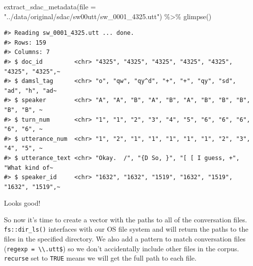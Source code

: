 \documentclass[
]{article}
\newenvironment{Shaded}{\begin{snugshade}}{\end{snugshade}}
\newcommand{\AttributeTok}[1]{\textcolor[rgb]{0.77,0.63,0.00}{#1}}
\newcommand{\CommentTok}[1]{\textcolor[rgb]{0.56,0.35,0.01}{\textit{#1}}}
\newcommand{\ConstantTok}[1]{\textcolor[rgb]{0.00,0.00,0.00}{#1}}
\newcommand{\FunctionTok}[1]{\textcolor[rgb]{0.00,0.00,0.00}{#1}}
\newcommand{\NormalTok}[1]{#1}
\newcommand{\OtherTok}[1]{\textcolor[rgb]{0.56,0.35,0.01}{#1}}
\newcommand{\SpecialCharTok}[1]{\textcolor[rgb]{0.00,0.00,0.00}{#1}}
\newcommand{\StringTok}[1]{\textcolor[rgb]{0.31,0.60,0.02}{#1}}
\begin{document}
\begin{Shaded}
\begin{Highlighting}[]
\FunctionTok{extract\_sdac\_metadata}\NormalTok{(}\AttributeTok{file =} \StringTok{"../data/original/sdac/sw00utt/sw\_0001\_4325.utt"}\NormalTok{) }\SpecialCharTok{\%\textgreater{}\%}
    \FunctionTok{glimpse}\NormalTok{()}
\end{Highlighting}
\end{Shaded}

\begin{verbatim}
#> Reading sw_0001_4325.utt ... done.
#> Rows: 159
#> Columns: 7
#> $ doc_id         <chr> "4325", "4325", "4325", "4325", "4325", "4325", "4325",~
#> $ damsl_tag      <chr> "o", "qw", "qy^d", "+", "+", "qy", "sd", "ad", "h", "ad~
#> $ speaker        <chr> "A", "A", "B", "A", "B", "A", "B", "B", "B", "B", "B", ~
#> $ turn_num       <chr> "1", "1", "2", "3", "4", "5", "6", "6", "6", "6", "6", ~
#> $ utterance_num  <chr> "1", "2", "1", "1", "1", "1", "1", "2", "3", "4", "5", ~
#> $ utterance_text <chr> "Okay.  /", "{D So, }", "[ [ I guess, +", "What kind of~
#> $ speaker_id     <chr> "1632", "1632", "1519", "1632", "1519", "1632", "1519",~
\end{verbatim}

Looks good!

So now it's time to create a vector with the paths to all of the conversation files. \texttt{fs::dir\_ls()} interfaces with our OS file system and will return the paths to the files in the specified directory. We also add a pattern to match conversation files (\texttt{regexp\ =\ \textbackslash{}\textbackslash{}.utt\$}) so we don't accidentally include other files in the corpus. \texttt{recurse} set to \texttt{TRUE} means we will get the full path to each file.

\begin{Shaded}
\end{Shaded}
\end{document}
